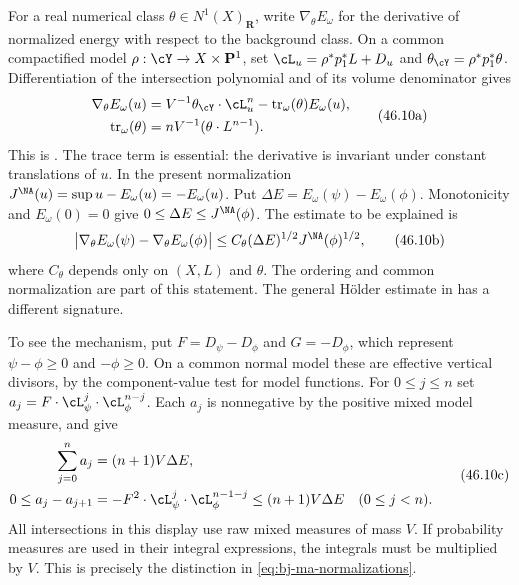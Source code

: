 For a real numerical class $\theta\in N^1(X)_{\mathbf R}$, write
$\nabla_\theta E_\omega$ for the derivative of normalized energy
with respect to the background class. On a common compactified model
$\rho:\cY\to X\times\mathbf P^1$, set
$\cL_u=\rho^*p_1^*L+D_u$ and
$\theta_{\cY}=\rho^*p_1^*\theta$. Differentiation of the
intersection polynomial and of its volume denominator gives
\[
 \begin{aligned}
 \nabla_\theta E_\omega(u)
   &=V^{-1}\theta_{\cY}\cdot\cL_u^n
           -\operatorname{tr}_\omega(\theta)E_\omega(u),\\
 \operatorname{tr}_\omega(\theta)
   &=nV^{-1}(\theta\cdot L^{n-1}).
 \end{aligned}
\tag{46.10a}\label{eq:ch46-polarization-derivative}
\]
This is \cite[Lemma~2.4, equation~(2.6)]{BJ23DivisorialV3}.
The trace term is essential: the derivative is invariant under
constant translations of $u$. In the present normalization
$J^{\NA}(u)=\sup u-E_\omega(u)=-E_\omega(u)$. Put
$\Delta E=E_\omega(\psi)-E_\omega(\phi)$.
Monotonicity and $E_\omega(0)=0$ give
$0\leq\Delta E\leq J^{\NA}(\phi)$.
The estimate to be explained is
\[
 \bigl|\nabla_\theta E_\omega(\psi)
             -\nabla_\theta E_\omega(\phi)\bigr|
 \leq C_\theta(\Delta E)^{1/2}J^{\NA}(\phi)^{1/2},
\tag{46.10b}\label{eq:ch46-ordered-polarization-estimate}
\]
where $C_\theta$ depends only on $(X,L)$ and $\theta$.
The ordering and common normalization are part of this statement.
The general H\"older estimate in
\cite[Lemma~2.8]{BJ23DivisorialV3} has a different signature.

To see the mechanism, put $F=D_\psi-D_\phi$ and $G=-D_\phi$,
which represent $\psi-\phi\geq0$ and $-\phi\geq0$.
On a common normal model these are effective vertical divisors,
by the component-value test for model functions. For $0\leq j\leq n$
set $a_j=F\cdot\cL_\psi^j\cdot\cL_\phi^{n-j}$.
Each $a_j$ is nonnegative by the positive mixed model measure, and
 give
\[
 \begin{aligned}
 \sum_{j=0}^n a_j&=(n+1)V\Delta E,\\
 0\leq a_j-a_{j+1}
   &=-F^2\cdot\cL_\psi^j\cdot\cL_\phi^{n-1-j}
        \leq(n+1)V\Delta E \quad(0\leq j<n).
 \end{aligned}
\tag{46.10c}\label{eq:ch46-ordered-telescoping-control}
\]
All intersections in this display use raw mixed measures of mass $V$.
If probability measures are used in their integral expressions, the
integrals must be multiplied by $V$. This is precisely the distinction
in \eqref{eq:bj-ma-normalizations}.

